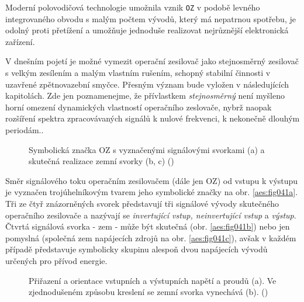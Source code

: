       Moderní polovodičová technologie umožnila vznik \texttt{OZ} v podobě levného integrovaného
      obvodu s malým počtem vývodů, který má nepatrnou spotřebu, je odolný proti přetížení a
      umožňuje jednoduše realizovat nejrůznější elektronická zařízení.
    
      V dnešním pojetí je možné vymezit operační zesilovač jako stejnosměrný zesilovač s velkým
      zesílením a malým vlastním rušením, schopný stabilní činnosti v uzavřené zpětnovazební smyčce.
      Přesným význam bude vyložen v následujících kapitolách. Zde jen poznamenejme, že přívlastkem
      \emph{stejnosměrný} není myšleno horní omezení dynamických vlastností operačního zeslovače,
      nybrž naopak rozšíření spektra zpracovávaných signálů k nulové frekvenci, k nekonečně dlouhým
      periodám.\cite[s.~5]{Dostal}.

      \begin{figure}[ht!]  %
        \centering
        \caption{Symbolická značka OZ s vyznačenými signálovými svorkami (a) 
                a skutečná realizace zemní svorky (b, c) (\cite[s.~5]{Dostal})}
        \label{aes:fig041}
      \end{figure}

      Směr signálového toku operačním zesilovačem (dále jen OZ) od vstupu k výstupu je vyznačen
      trojúhelníkovým tvarem jeho symbolické značky na obr. \ref{aes:fig041a}. Tři ze čtyř
      znázorněných svorek představují tři signálové vývody skutečného operačního zesilovače a
      nazývají se \emph{invertující vstup, neinvertující vstup} a \emph{výstup}. Čtvrtá signálová
      svorka - zem - může být skutečná (obr. \ref{aes:fig041b}) nebo jen pomyslná (společná zem
      napájecích zdrojů na obr. \ref{aes:fig041c}), avšak v každém případě představuje symbolicky
      skupinu alespoň dvou napájecích vývodů určených pro přívod energie.  

      \begin{figure}[ht!]  %
        \centering
        \caption{Přiřazení a orientace vstupních a výstupních napětí a proudů (a). Ve zjednodušeném 
                způsobu kreslení se zemní svorka vynechává (b). (\cite[s.~6]{Dostal})}
        \label{aes:fig042}
      \end{figure}

